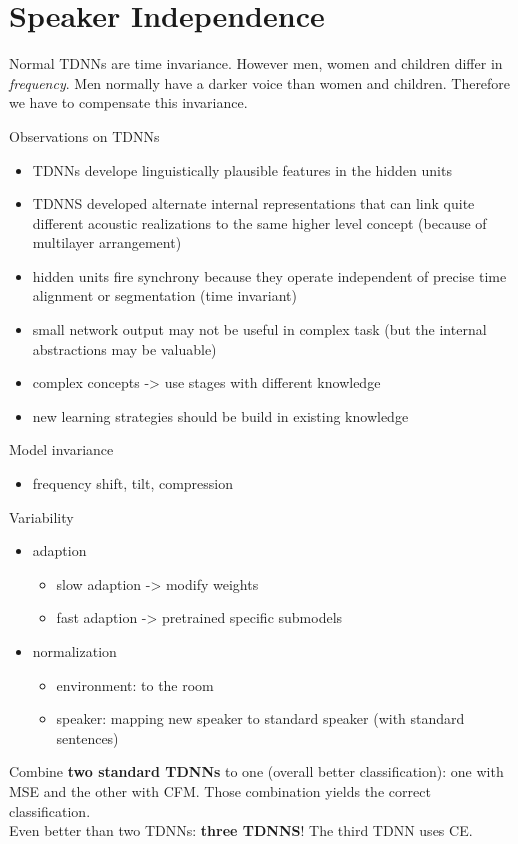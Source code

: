 \section{Speaker Independence}
\label{sect:speaker-independence}
Normal TDNNs are time invariance. However men, women and children differ in \textit{frequency}. Men normally have a darker voice than women and children. Therefore we have to compensate this invariance.


Observations on TDNNs
\begin{itemize}
	\item TDNNs develope linguistically plausible features in the hidden units
	\item TDNNS developed alternate internal representations that can link quite different acoustic realizations to the same higher level concept (because of multilayer arrangement)
	\item hidden units fire synchrony because they operate independent of precise time alignment or segmentation (time invariant)
	\item small network output may not be useful in complex task (but the internal abstractions may be valuable)
	\item complex concepts -> use stages with different knowledge
	\item new learning strategies should be build in existing knowledge
\end{itemize}
Model invariance
\begin{itemize}
	\item frequency shift, tilt, compression
\end{itemize}
Variability
\begin{itemize}
	\item adaption
		\begin{itemize}
			\item slow adaption -> modify weights
			\item fast adaption -> pretrained specific submodels
		\end{itemize}
	\item normalization
		\begin{itemize}
			\item environment: to the room
			\item speaker: mapping new speaker to standard speaker (with standard sentences)
		\end{itemize}
\end{itemize}
Combine \textbf{two standard TDNNs} to one (overall better classification): one with MSE and the other with CFM. Those combination yields the correct classification.\\
Even better than two TDNNs: \textbf{three TDNNS}! The third TDNN uses CE.

